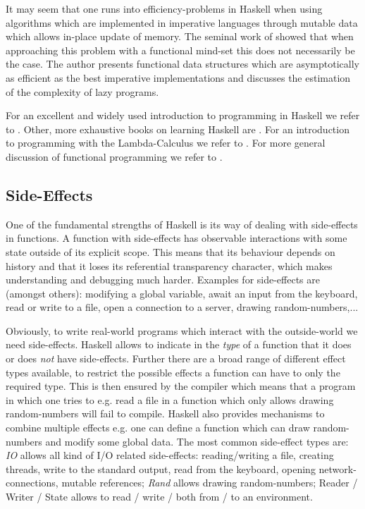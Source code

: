 It may seem that one runs into efficiency-problems in Haskell when using algorithms which are implemented in imperative languages through mutable data which allows in-place update of memory. The seminal work of \cite{okasaki_purely_1999} showed that when approaching this problem with a functional mind-set this does not necessarily be the case. The author presents functional data structures which are asymptotically as efficient as the best imperative implementations and discusses the estimation of the complexity of lazy programs.

For an excellent and widely used introduction to programming in Haskell we refer to \cite{hutton_programming_2016}. Other, more exhaustive books on learning Haskell are \cite{lipovaca_learn_2011,allen_haskell_2016}. For an introduction to programming with the Lambda-Calculus we refer to \cite{michaelson_introduction_2011}. For more general discussion of functional programming we refer to \cite{hughes_why_1989,maclennan_functional_1990,hudak_history_2007}.

\subsection{Side-Effects}
One of the fundamental strengths of Haskell is its way of dealing with side-effects in functions. A function with side-effects has observable interactions with some state outside of its explicit scope. This means that its behaviour depends on history and that it loses its referential transparency character, which makes understanding and debugging much harder. Examples for side-effects are (amongst others): modifying a global variable, await an input from the keyboard, read or write to a file, open a connection to a server, drawing random-numbers,...

Obviously, to write real-world programs which interact with the outside-world we need side-effects. Haskell allows to indicate in the \textit{type} of a function that it does or does \textit{not} have side-effects. Further there are a broad range of different effect types available, to restrict the possible effects a function can have to only the required type. This is then ensured by the compiler which means that a program in which one tries to e.g. read a file in a function which only allows drawing random-numbers will fail to compile. Haskell also provides mechanisms to combine multiple effects e.g. one can define a function which can draw random-numbers and modify some global data. The most common side-effect types are: \textit{IO} allows all kind of I/O related side-effects: reading/writing a file, creating threads, write to the standard output, read from the keyboard, opening network-connections, mutable references; \textit{Rand}  allows drawing random-numbers; Reader / Writer / State allows to read / write / both from / to an environment.

